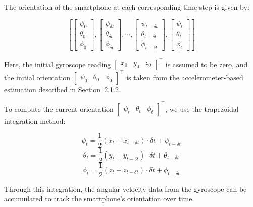\documentclass{article}
\begin{document}
The orientation of the smartphone at each corresponding time step is given by:

\[
\left[
\begin{bmatrix}\psi_0\\\theta_0\\\phi_0\end{bmatrix},
\begin{bmatrix}\psi_{\delta t}\\\theta_{\delta t}\\\phi_{\delta t}\end{bmatrix},
\cdots,
\begin{bmatrix}\psi_{t-\delta t}\\\theta_{t-\delta t}\\\phi_{t-\delta t} \end{bmatrix},
\begin{bmatrix}\psi_t\\\theta_t\\\phi_t \end{bmatrix}
\right]
\]

Here, the initial gyroscope reading $\begin{bmatrix}x_0&y_0&z_0\end{bmatrix}^\top$ is assumed to be zero, and the initial orientation $\begin{bmatrix}\psi_0&\theta_0&\phi_0\end{bmatrix}^\top$ is taken from the accelerometer-based estimation described in Section~2.1.2.

To compute the current orientation $\begin{bmatrix}\psi_t&\theta_t&\phi_t\end{bmatrix}^\top$, we use the trapezoidal integration method:

\[
\psi_t = \frac{1}{2}(x_t + x_{t - \delta t}) \cdot \delta t + \psi_{t - \delta t}
\]
\[
\theta_t = \frac{1}{2}(y_t + y_{t - \delta t}) \cdot \delta t + \theta_{t - \delta t}
\]
\[
\phi_t = \frac{1}{2}(z_t + z_{t - \delta t}) \cdot \delta t + \phi_{t - \delta t}
\]

Through this integration, the angular velocity data from the gyroscope can be accumulated to track the smartphone’s orientation over time.
\end{document}
